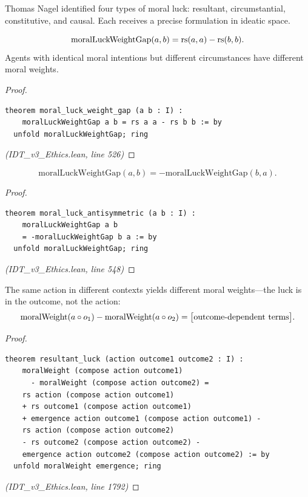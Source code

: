 Thomas Nagel identified four types of moral luck: resultant, circumstantial,
constitutive, and causal. Each receives a precise formulation in ideatic space.

\begin{theorem}
\label{thm:moral-luck}
\[
  \mathrm{moralLuckWeightGap}(a, b) = \mathrm{rs}(a,a) - \mathrm{rs}(b,b).
\]
Agents with identical moral intentions but different circumstances have
different moral weights.
\end{theorem}

\begin{proof}
\begin{lstlisting}
theorem moral_luck_weight_gap (a b : I) :
    moralLuckWeightGap a b = rs a a - rs b b := by
  unfold moralLuckWeightGap; ring
\end{lstlisting}
\textit{(IDT\_v3\_Ethics.lean, line 526)}
\end{proof}

\begin{theorem}
\label{thm:luck-antisymm}
\[
  \mathrm{moralLuckWeightGap}(a, b) = -\mathrm{moralLuckWeightGap}(b, a).
\]
\end{theorem}

\begin{proof}
\begin{lstlisting}
theorem moral_luck_antisymmetric (a b : I) :
    moralLuckWeightGap a b
    = -moralLuckWeightGap b a := by
  unfold moralLuckWeightGap; ring
\end{lstlisting}
\textit{(IDT\_v3\_Ethics.lean, line 548)}
\end{proof}

\begin{theorem}
\label{thm:resultant-luck}
The same action in different contexts yields different moral weights---the
luck is in the outcome, not the action:
\[
  \mathrm{moralWeight}(a \circ o_1) - \mathrm{moralWeight}(a \circ o_2)
  = \bigl[\text{outcome-dependent terms}\bigr].
\]
\end{theorem}

\begin{proof}
\begin{lstlisting}
theorem resultant_luck (action outcome1 outcome2 : I) :
    moralWeight (compose action outcome1)
      - moralWeight (compose action outcome2) =
    rs action (compose action outcome1)
    + rs outcome1 (compose action outcome1)
    + emergence action outcome1 (compose action outcome1) -
    rs action (compose action outcome2)
    - rs outcome2 (compose action outcome2) -
    emergence action outcome2 (compose action outcome2) := by
  unfold moralWeight emergence; ring
\end{lstlisting}
\textit{(IDT\_v3\_Ethics.lean, line 1792)}
\end{proof}


